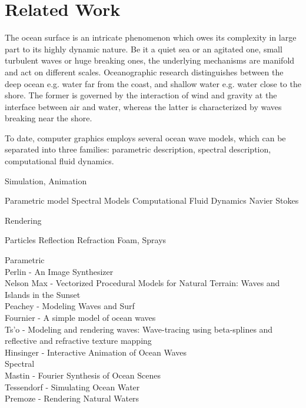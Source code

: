 \chapter{Related Work}
\label{ch:state_of_the_art}

The ocean surface is an intricate phenomenon which owes its complexity in large part
to its highly dynamic nature. Be it a quiet sea or an agitated one, small turbulent waves
or huge breaking ones, the underlying mechanisms are manifold and act on different scales.
Oceanographic research distinguishes between the deep ocean e.g. water far from the coast,
and shallow water e.g. water close to the shore.  The former is governed by the interaction
of wind and gravity at the interface between air and water, whereas the latter is
characterized by waves breaking near the shore.

To date, computer graphics employs several ocean wave models, which can be separated into
three families: parametric description, spectral description, computational fluid dynamics.


Simulation, Animation

Parametric model
Spectral Models
Computational Fluid Dynamics
Navier Stokes

Rendering

Particles
Reflection
Refraction
Foam, Sprays

Parametric\\
Perlin - An Image Synthesizer \cite{Perlin:1985}\\
Nelson Max - Vectorized Procedural Models for Natural Terrain: Waves and Islands in the Sunset \cite{Max:1981}\\
Peachey - Modeling Waves and Surf \cite{Peachey:1986}\\
Fournier - A simple model of ocean waves \cite{Fournier:1986}\\
Ts'o - Modeling and rendering waves: Wave-tracing using beta-splines and reflective and refractive texture mapping \cite{Ts'o:1987}\\Hinsinger - Interactive Animation of Ocean Waves \cite{Hinsinger:2002}\\

Spectral\\
Mastin - Fourier Synthesis of Ocean Scenes \cite{Mastin:1987}\\
Tessendorf - Simulating Ocean Water \cite{course:simulatingocean}\\
Premoze - Rendering Natural Waters \cite{Premoze:2000} \\

